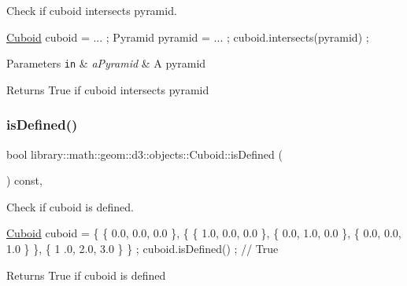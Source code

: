Check if cuboid intersects pyramid. 


\begin{DoxyCode}
\hyperlink{classlibrary_1_1math_1_1geom_1_1d3_1_1objects_1_1_cuboid_ac42299f962fab284a76a46d4ea4e6fa2}{Cuboid} cuboid = ... ;
Pyramid pyramid = ... ;
cuboid.intersects(pyramid) ;
\end{DoxyCode}



\begin{DoxyParams}[1]{Parameters}
\mbox{\tt in}  & {\em a\+Pyramid} & A pyramid \\
\hline
\end{DoxyParams}
\begin{DoxyReturn}{Returns}
True if cuboid intersects pyramid 
\end{DoxyReturn}
\mbox{\label{classlibrary_1_1math_1_1geom_1_1d3_1_1objects_1_1_cuboid_ac64560345dc021b569eed66004af96ee}} 
\subsubsection{\texorpdfstring{is\+Defined()}{isDefined()}}
{\footnotesize\ttfamily bool library\+::math\+::geom\+::d3\+::objects\+::\+Cuboid\+::is\+Defined (\begin{DoxyParamCaption}{ }\end{DoxyParamCaption}) const\hspace{0.3cm}{\ttfamily [override]}, {\ttfamily [virtual]}}



Check if cuboid is defined. 


\begin{DoxyCode}
\hyperlink{classlibrary_1_1math_1_1geom_1_1d3_1_1objects_1_1_cuboid_ac42299f962fab284a76a46d4ea4e6fa2}{Cuboid} cuboid = \{ \{ 0.0, 0.0, 0.0 \}, \{ \{ 1.0, 0.0, 0.0 \}, \{ 0.0, 1.0, 0.0 \}, \{ 0.0, 0.0, 1.0 \} \}, \{ 1
      .0, 2.0, 3.0 \} \} ;
cuboid.isDefined() ; \textcolor{comment}{// True}
\end{DoxyCode}


\begin{DoxyReturn}{Returns}
True if cuboid is defined 
\end{DoxyReturn}



